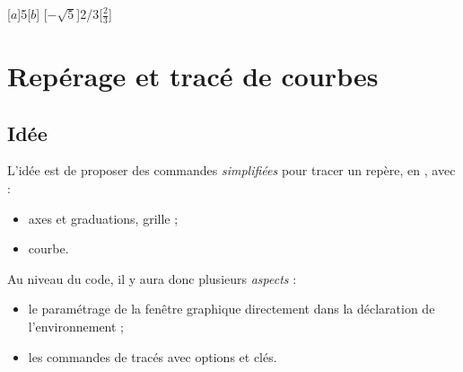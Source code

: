 \begin{PresCodePL}{}
\begin{RepIntervalles}[Graduations={-8,-7,...,8}]
\end{RepIntervalles}
\end{PresCodePL}

\begin{PresCodePL}{}

\begin{RepIntervalles}[Graduations={-8,-7,...,8}]
	[$a$]{5}[$b$]
	[$-\sqrt{5}$]{2/3}[$\tfrac23$]
\end{RepIntervalles}
\end{PresCodePL}

\pagebreak

\section{Repérage et tracé de courbes}\label{reperagetikz}

\subsection{Idée}

\begin{tipblock}
 L'idée est de proposer des commandes \textit{simplifiées} pour tracer un repère, en \TikZ, avec :

\begin{itemize}
	\item axes et graduations, grille ;
	\item courbe.
\end{itemize}
\vspace*{-\baselineskip}\leavevmode
\end{tipblock}

\begin{noteblock}
Au niveau du code, il y aura donc plusieurs \textit{aspects} :

\begin{itemize}
	\item le paramétrage de la fenêtre graphique directement dans la déclaration de l'environnement ;
	\item les commandes de tracés avec options et clés.
\end{itemize}
\vspace*{-\baselineskip}\leavevmode
\end{noteblock}


